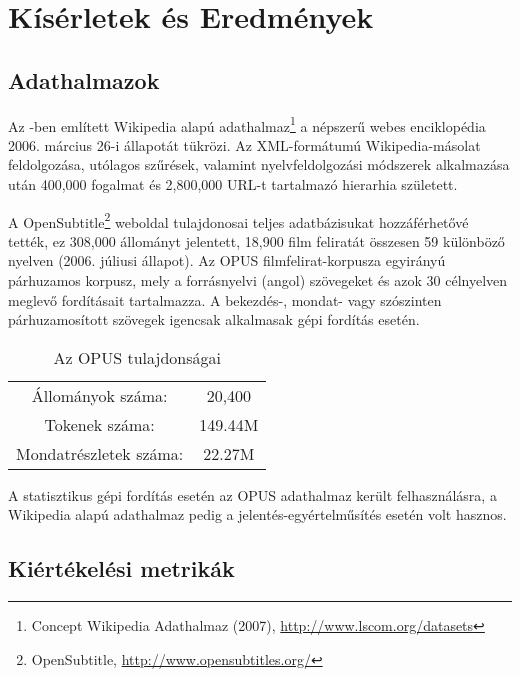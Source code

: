 \section{Kísérletek és Eredmények} \label{sec:results}

\subsection{Adathalmazok}

Az \cite{Gabrilovich:2007:CSR}-ben említett Wikipedia alapú adathalmaz\footnote{Concept Wikipedia Adathalmaz (2007),  \url{http://www.lscom.org/datasets}} a népszerű webes enciklopédia 2006. március 26-i állapotát tükrözi. Az XML-formátumú Wikipedia-másolat feldolgozása, utólagos szűrések, valamint nyelvfeldolgozási módszerek alkalmazása után 400,000 fogalmat és 2,800,000 URL-t tartalmazó hierarhia született. 

A OpenSubtitle\footnote{OpenSubtitle, \url{http://www.opensubtitles.org/}} weboldal tulajdonosai teljes adatbázisukat hozzáférhetővé tették, ez 308,000 állományt jelentett, 18,900 film feliratát összesen 59 különböző nyelven (2006. júliusi állapot). Az OPUS filmfelirat-korpusza \cite{Tiedemann:RANLP5} egyirányú párhuzamos korpusz, mely a forrásnyelvi (angol) szövegeket és azok 30 célnyelven meglevő fordításait tartalmazza. A bekezdés-, mondat- vagy szószinten párhuzamosított szövegek igencsak alkalmasak gépi fordítás esetén.

\begin{table}[h!]
\centering
\normalsize
 \begin{tabular}{| c | c |} 
 \hline\hline
 Állományok száma: & 20,400 \\ [1ex]
 
 Tokenek száma: & 149.44M \\ [1ex]
 
  Mondatrészletek száma: & 22.27M  \\ [1ex] 
 \hline
 \end{tabular}
 \caption{Az OPUS tulajdonságai}
\end{table}

A statisztikus gépi fordítás esetén az OPUS adathalmaz került felhasználásra, a Wikipedia alapú adathalmaz pedig a jelentés-egyértelműsítés esetén volt hasznos.

\subsection{Kiértékelési metrikák}

